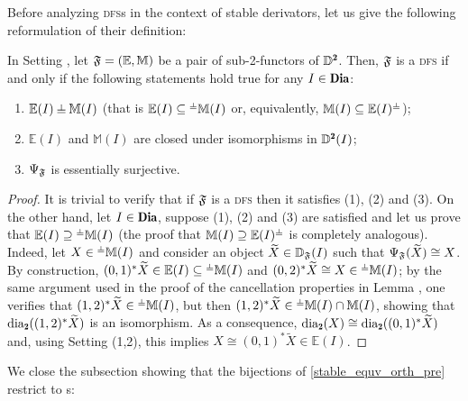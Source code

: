 Before analyzing \textsc{dfs}s in the context of stable derivators, let us give the following reformulation of their definition:

\begin{lemma}\label{easier_def_dfs}
In Setting , let $\mathfrak{F}=(\mathbb E,\mathbb M)$ be a pair of sub-2-functors of $\D^\due$. Then, $\mathfrak{F}$ is a \textsc{dfs} if and only if the following statements hold true for any $I\in \Dia$:
\begin{enumerate}
\item $\mathbb E(I)\corth \mathbb M(I)$ (that is $\mathbb E(I)\subseteq {}^{\corth} \mathbb M(I)$ or, equivalently, $\mathbb M(I)\subseteq  \mathbb E(I)^{\corth}$);
\item $\mathbb E(I)$ and $\mathbb M(I)$ are closed under isomorphisms in $\D^\due(I)$;%
\item $\Psi_{\mathfrak{F}}$ is essentially surjective.
\end{enumerate}
\end{lemma}
\begin{proof}
It is trivial to verify that if $\mathfrak{F}$ is a \textsc{dfs} then it satisfies (1), (2) and (3). On the other hand, let $I\in \Dia$, suppose (1), (2) and (3) are satisfied and let us prove that $\mathbb E(I)\supseteq {}^{\corth} \mathbb M(I)$ (the proof that $\mathbb M(I)\supseteq  \mathbb E(I)^{\corth}$ is completely analogous). Indeed, let $X\in{}^{\corth} \mathbb M(I)$ and consider an object $\widetilde X\in \mathbb{D}_{\mathfrak{F}}(I)$ such that $\Psi_{\mathfrak{F}}(\widetilde X)\cong X$. By construction, $(0,1)^*\widetilde X\in \mathbb E(I)\subseteq {}^{\corth}\mathbb M(I)$ and $(0,2)^*\widetilde X\cong X\in {}^{\corth}\mathbb M(I)$; by the same argument used in the proof of the cancellation properties in Lemma , one verifies that $(1,2)^*\widetilde X\in {}^{\corth}\mathbb M(I)$, but then $(1,2)^*\widetilde X\in {}^{\corth}\mathbb M(I)\cap \mathbb M(I)$, showing that $\dia_\due((1,2)^*\widetilde X)$ is an isomorphism. As a consequence, $\dia_\due(X)\cong \dia_\due((0,1)^*\widetilde X)$ and, using Setting (1,2), this implies $X\cong (0,1)^*\widetilde X\in \mathbb E(I)$.
\end{proof}


We close the subsection showing that the bijections of \athm \ref{stable_equv_orth_pre} restrict to {\dfs}s:


